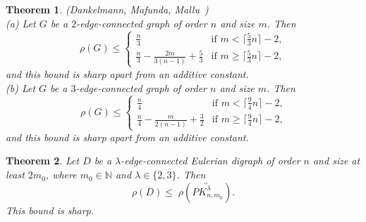 \documentclass[a4paper,11pt]{article}
\newtheorem{theorem}{Theorem}[section]
\begin{document}
\begin{theorem}\label{theo:remoteness-of-edge-connected-graphs}
{\rm (Dankelmann, Mafunda, Mallu~\cite{DanMafMal2025})}\\
(a) Let $G$ be a $2$-edge-connected graph of order $n$ and size $m$. 
Then
\[ \rho(G) \leq \left\{ \begin{array}{cc}
   \frac{n}{3} & \textrm{if $m <\lceil \frac{5}{3}n \rceil -2$,} \\
   \frac{n}{3} - \frac{2m}{3(n-1)} +\frac{5}{3} 
         & \textrm{if $m  \geq \lceil \frac{5}{3}n \rceil -2$},
      \end{array} \right. \]
and this bound is sharp apart from an additive constant. \\
(b) Let $G$ be a $3$-edge-connected graph of order $n$ and size $m$. 
Then
\[ \rho(G) \leq \left\{ \begin{array}{cc}
   \frac{n}{4} & \textrm{if $m < \lceil \frac{9}{4}n\rceil -2$,} \\
   \frac{n}{4} - \frac{m}{2(n-1)} + \frac{3}{2} 
        & \textrm{if $m \geq \lceil \frac{9}{4}n\rceil -2$,}
      \end{array} \right. \]
and this bound is sharp apart from an additive constant. 
\end{theorem}
 
\begin{theorem}\label{th:rho(2-edge D)}
Let $ D $ be a $\lambda$-edge-connected Eulerian digraph of order $ n $ and size at least $ 2m_{0} $, where $m_0 \in \mathbb{N}$  and $\lambda\in\{2,3\}$. Then 
\[\rho(D) \leq \; \rho(\overleftrightarrow{PK^{\lambda}_{n,m_0}}). \]
This bound is sharp.
\end{theorem}
\end{document}
